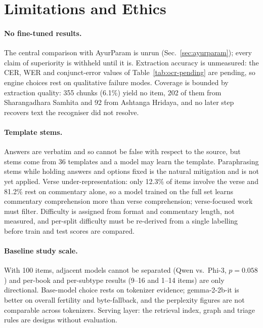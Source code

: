 \documentclass[10pt,twocolumn,letterpaper]{article}
\begin{document}
\section{Limitations and Ethics}
\label{sec:limitations}

\paragraph{No fine-tuned results.}
The central comparison with AyurParam is unrun (Sec.~\ref{sec:ayurparam}); every
claim of superiority is withheld until it is. Extraction accuracy is unmeasured:
the CER, WER and conjunct-error values of Table~\ref{tab:ocr-pending} are pending,
so engine choices rest on qualitative failure modes. Coverage is bounded by
extraction quality: 355 chunks (6.1\%) yield no item, 202 of them from
Sharangadhara Samhita and 92 from Ashtanga Hridaya, and no later step recovers
text the recogniser did not resolve.

\paragraph{Template stems.}
Answers are verbatim and so cannot be false with respect to the source, but
stems come from 36 templates and a model may learn the template. Paraphrasing
stems while holding answers and options fixed is the natural mitigation and is
not yet applied. Verse under-representation: only 12.3\% of items involve the
verse and 81.2\% rest on commentary alone, so a model trained on the full set
learns commentary comprehension more than verse comprehension; verse-focused work
must filter. Difficulty is assigned from format and commentary length, not
measured, and per-split difficulty must be re-derived from a single labelling
before train and test scores are compared.

\paragraph{Baseline study scale.}
With 100 items, adjacent models cannot be separated (Qwen vs.\ Phi-3, $p=0.058$)
and per-book and per-subtype results (9--16 and 1--14 items) are only
directional. Base-model choice rests on tokenizer evidence; gemma-2-2b-it is
better on overall fertility and byte-fallback, and the perplexity figures are not
comparable across tokenizers. Serving layer: the retrieval index, graph and
triage rules are designs without evaluation.
\end{document}
